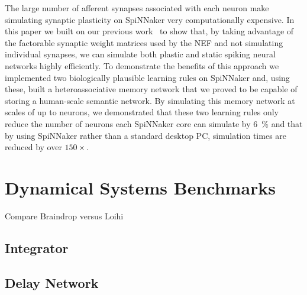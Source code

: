 The large number of afferent synapses associated with each neuron make simulating synaptic plasticity on SpiNNaker very computationally expensive.
In this paper we built on our previous work~\citep{mundy2015} to show that, by taking advantage of the factorable synaptic weight matrices used by the NEF and not simulating individual synapses, we can simulate both plastic and static spiking neural networks highly efficiently.
To demonstrate the benefits of this approach we implemented two biologically plausible learning rules on SpiNNaker and, using these, built a heteroassociative memory network that we proved to be capable of storing a human-scale semantic network.
By simulating this memory network at scales of up to  neurons, we demonstrated that these two learning rules only reduce the number of neurons each SpiNNaker core can simulate by \SI{6}{\percent} and that by using SpiNNaker rather than a standard desktop PC, simulation times are reduced by over $150\times$.

\section{Dynamical Systems Benchmarks}

Compare Braindrop versus Loihi

\subsection{Integrator}

\subsection{Delay Network}

